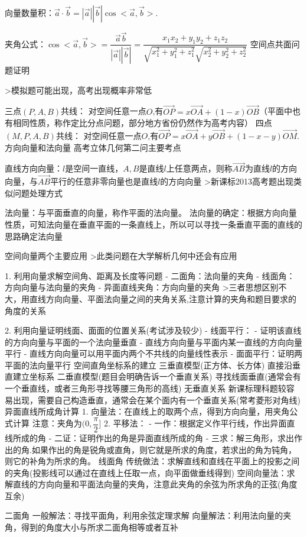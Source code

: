 \documentclass{BHCexam}
\begin{document}
向量数量积：$\vec{a}\cdot\vec{b}=|\vec{a}||\vec{b}|\cos<\vec{a},\vec{b}>$.

夹角公式：$\cos <\vec{a},\vec{b}>=\dfrac{\vec{a}\vec{b}}{|\vec{a}||\vec{b}|}=\dfrac{x_1x_2+y_1y_2+z_1z_2}{\sqrt{x_1^2+y_1^2+z_1^2}\sqrt{x_2^2+y_2^2+z_2^2}}$
 空间点共面问题证明


>模拟题可能出现，高考出现概率非常低


 三点$(P,A,B)$共线：
对空间任意一点$O$,有$\vec{OP}=x\vec{OA}+(1-x)\vec{OB}$（平面中也有相同性质，称作定比分点问题，部分地方省份仍然作为高考内容）
 四点$(M,P,A,B)$共线：
对空间任意一点$O$,有$\vec{OP}=x\vec{OA}+y\vec{OB}+(1-x-y)\vec{OM}$.
 方向向量和法向量
高考立体几何第二问主要考点

直线方向向量：$l$是空间一直线，$A,B$是直线$l$上任意两点，则称$\vec{AB}$为直线$l$的方向向量，与$\vec{AB}$平行的任意非零向量也是直线$l$的方向向量
>新课标2013高考题出现类似问题处理方式

法向量：与平面垂直的向量，称作平面的法向量。
法向量的确定：根据方向向量性质，可知法向量在垂直平面的一条直线上，所以可以寻找一条垂直平面的直线的思路确定法向量

空间向量两个主要应用
>此类问题在大学解析几何中还会有应用


1. 利用向量求解空间角、距离及长度等问题
- 二面角：法向量的夹角
- 线面角：方向向量与法向量的夹角
- 异面直线夹角：方向向量的夹角
>三者思想区别不大，用直线方向向量、平面法向量之间的夹角关系,注意计算的夹角和题目要求的角度的关系

2. 利用向量证明线面、面面的位置关系(考试涉及较少)
- 线面平行：
		- 证明该直线的方向向量与平面的一个法向量垂直
		- 直线方向向量与平面内某一直线的方向向量平行
		- 直线方向向量可以用平面内两个不共线的向量线性表示
	- 面面平行：证明两平面的法向量平行
 	空间直角坐标系的建立
三垂直模型(正方体、长方体)
直接沿垂直建立坐标系
二垂直模型(题目会明确告诉一个垂直关系)
寻找线面垂直(通常会有一个垂直线，或者三角形寻找等腰三角形的高线)
无垂直关系
新课标理科题较容易出现，需要自己构造垂直，通常会在某个面内有一个垂直关系(常考菱形对角线)
异面直线所成角计算
1. 向量法：在直线上的取两个点，得到方向向量，用夹角公式计算
注意：夹角为$(0,\dfrac{\pi}{2}]$
2. 平移法：
	- 一作：根据定义作平行线，作出异面直线所成的角
	- 二证：证明作出的角是异面直线所成的角
	- 三求：解三角形，求出作出的角.如果作出的角是锐角或直角，则它就是所求的角度，若求出的角为钝角，则它的补角为所求的角。
线面角
传统做法：求解直线和直线在平面上的投影之间的夹角(投影线可以通过在直线上任取一点，向平面做垂线得到)
空间向量法：求解直线的方向向量和平面法向量的夹角，注意此夹角的余弦为所求角的正弦(角度互余)

二面角
一般解法：寻找平面角，利用余弦定理求解
向量解法：利用法向量的夹角，得到的角度大小与所求二面角相等或者互补
\end{document}
